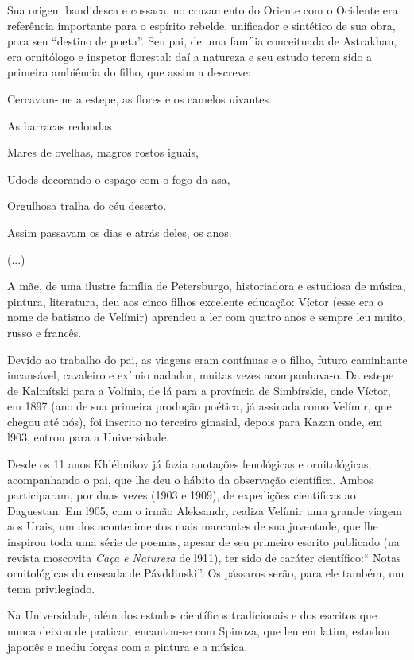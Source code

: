 Sua origem bandidesca e cossaca, no cruzamento do Oriente com o Ocidente
era referência importante para o espírito rebelde, unificador e
sintético de sua obra, para seu ``destino de poeta''. Seu pai, de uma
família conceituada de Astrakhan, era ornitólogo e inspetor florestal:
daí a natureza e seu estudo terem sido a primeira ambiência do filho,
que assim a descreve:

Cercavam-me a estepe, as flores e os camelos uivantes.

As barracas redondas

Mares de ovelhas, magros rostos iguais,

Udods decorando o espaço com o fogo da asa,

Orgulhosa tralha do céu deserto.

Assim passavam os dias e atrás deles, os anos.

(...)

A mãe, de uma ilustre família de Petersburgo, historiadora e estudiosa
de música, pintura, literatura, deu aos cinco filhos excelente educação:
Víctor (esse era o nome de batismo de Velímir) aprendeu a ler com quatro
anos e sempre leu muito, russo e francês.

Devido ao trabalho do pai, as viagens eram contínuas e o filho, futuro
caminhante incansável, cavaleiro e exímio nadador, muitas vezes
acompanhava-o. Da estepe de Kalmítski para a Volínia, de lá para a
província de Simbírskie, onde Víctor, em 1897 (ano de sua primeira
produção poética, já assinada como Velímir, que chegou até nós), foi
inscrito no terceiro ginasial, depois para Kazan onde, em l903, entrou
para a Universidade.

Desde os 11 anos Khlébnikov já fazia anotações fenológicas e
ornitológicas, acompanhando o pai, que lhe deu o hábito da observação
científica. Ambos participaram, por duas vezes (1903 e 1909), de
expedições científicas ao Daguestan. Em l905, com o irmão Aleksandr,
realiza Velímir uma grande viagem aos Urais, um dos acontecimentos mais
marcantes de sua juventude, que lhe inspirou toda uma série de poemas,
apesar de seu primeiro escrito publicado (na revista moscovita
\emph{Caça e Natureza} de l911), ter sido de caráter científico:`` Notas
ornitológicas da enseada de Pávddinski''. Os pássaros serão, para ele
também, um tema privilegiado.

Na Universidade, além dos estudos científicos tradicionais e dos
escritos que nunca deixou de praticar, encantou-se com Spinoza, que leu
em latim, estudou japonês e mediu forças com a pintura e a música.

